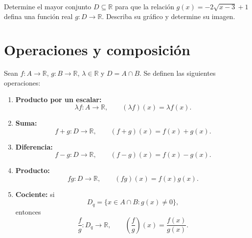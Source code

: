 \documentclass[10pt,a5paper]{article}
\newif\ifmostrarSoluciones
\begin{document}
\begin{ejemplo}[transformaciones]
Determine el mayor conjunto $D\subseteq\mathbb{R}$ para que la relación $g(x)=-2\sqrt{x-3}+1$ defina una función real $g:D\to\mathbb{R}$. Describa su gráfico y determine su imagen.
\end{ejemplo}
\ifmostrarSoluciones
\begin{solucion}
Desde $y=\sqrt{x}$: trasladar $3$ unidades a la derecha, escalar verticalmente por $2$, reflejar respecto del eje $x$ y trasladar $1$ unidad hacia arriba. El punto inicial es $(3,1)$, el dominio es $[3,\infty)$ y la imagen es $(-\infty,1]$.
\begin{center}
\begin{tikzpicture}[x=0.72cm,y=0.58cm,every node/.style={font=\scriptsize}]
  \draw[Gris!70] (2.3,0)--(9,0) node[right] {$x$};
  \draw[Gris!70] (3,-4.1)--(3,2) node[above] {$y$};
  \draw[Gris,dashed] (3,0)--(3,1);
  \draw[Azul,very thick,domain=3:8.5,samples=70]
    plot (\x,{-2*sqrt(\x-3)+1});
  \fill[Rojo] (3,1) circle (1.7pt);
  \node[above right] at (3,1) {$(3,1)$};
  \node[below left] at (3,0) {$3$};
  \node[left] at (3,1) {$1$};
  \node[below] at (6.5,-3.2) {$g(x)=-2\sqrt{x-3}+1$};
\end{tikzpicture}
\end{center}
\end{solucion}
\else\vspace{15mm}\fi

\section*{Operaciones y composición}

\begin{definicion}[operaciones]
Sean $f:A\to\mathbb{R}$, $g:B\to\mathbb{R}$, $\lambda\in\mathbb{R}$ y $D=A\cap B$. Se definen las siguientes operaciones:
\begin{enumerate}
  \item \textbf{Producto por un escalar:}
  \[
  \lambda f:A\to\mathbb{R},\qquad
  (\lambda f)(x)=\lambda f(x).
  \]
  \item \textbf{Suma:}
  \[
  f+g:D\to\mathbb{R},\qquad
  (f+g)(x)=f(x)+g(x).
  \]
  \item \textbf{Diferencia:}
  \[
  f-g:D\to\mathbb{R},\qquad
  (f-g)(x)=f(x)-g(x).
  \]
  \item \textbf{Producto:}
  \[
  fg:D\to\mathbb{R},\qquad
  (fg)(x)=f(x)g(x).
  \]
  \item \textbf{Cociente:} si
  \[
  D_q=\{x\in A\cap B:g(x)\neq0\},
  \]
  entonces
  \[
  \frac{f}{g}:D_q\to\mathbb{R},\qquad
  \left(\frac fg\right)(x)=\frac{f(x)}{g(x)}.
  \]
\end{enumerate}
\end{definicion}
\end{document}
